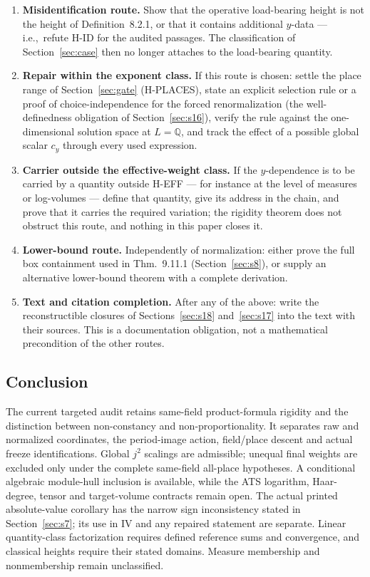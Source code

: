 \documentclass[11pt,a4paper]{article}
\theoremstyle{definition}
\theoremstyle{remark}
\begin{document}
\begin{enumerate}
\item \textbf{Misidentification route.} Show that the operative
  load-bearing height is not the height of Definition~8.2.1, or that it
  contains additional $y$-data --- i.e.,\ refute H-ID for the audited
  passages. The classification of Section~\ref{sec:case} then no longer
  attaches to the load-bearing quantity.
\item \textbf{Repair within the exponent class.} If this route is chosen:
  settle the place range of Section~\ref{sec:gate} (H-PLACES), state an
  explicit selection rule or a proof of choice-independence for the forced
  renormalization (the well-definedness obligation of
  Section~\ref{sec:s16}), verify the rule against the one-dimensional
  solution space at $L = \mathbb{Q}$, and track the effect of a possible
  global scalar $c_y$ through every used expression.
\item \textbf{Carrier outside the effective-weight class.} If the
  $y$-dependence is to be carried by a quantity outside H-EFF --- for
  instance at the level of measures or log-volumes --- define that
  quantity, give its address in the chain, and prove that it carries the
  required variation; the rigidity theorem does not obstruct this route,
  and nothing in this paper closes it.
\item \textbf{Lower-bound route.} Independently of normalization: either
  prove the full box containment used in Thm.~9.11.1
  (Section~\ref{sec:s8}), or supply an alternative lower-bound theorem with
  a complete derivation.
\item \textbf{Text and citation completion.} After any of the above:
  write the reconstructible closures of Sections~\ref{sec:s18}
  and~\ref{sec:s17} into the text with their sources. This is a
  documentation obligation, not a mathematical precondition of the other
  routes.
\end{enumerate}

\subsection{Conclusion}

The current targeted audit retains same-field product-formula rigidity
and the distinction between non-constancy and non-proportionality. It
separates raw and normalized coordinates, the period-image action,
field/place descent and actual freeze identifications. Global $j^2$
scalings are admissible; unequal final weights are excluded only under
the complete same-field all-place hypotheses. A conditional algebraic
module-hull inclusion is available, while the ATS logarithm, Haar-degree,
tensor and target-volume contracts remain open. The actual printed
absolute-value corollary has the narrow sign inconsistency stated in
Section~\ref{sec:s7}; its use in IV and any repaired statement are separate.
Linear quantity-class factorization requires defined reference sums and
convergence, and classical heights require their stated domains.
Measure membership and nonmembership remain unclassified.
\end{document}
